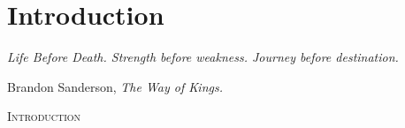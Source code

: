 \chapter{Introduction}
\label{ch:introduction}

\setlength{}
\epigraph{\itshape Life Before Death. Strength before weakness. Journey before destination.}{Brandon Sanderson, \textit{The Way of Kings.}}

\lettrine{I}{ntroduction} \lipsum[1-4]